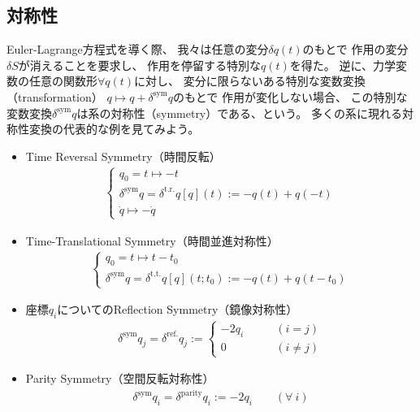 \subsection{対称性}

Euler-Lagrange方程式を導く際、
我々は任意の変分$\delta q(t)$のもとで
作用の変分$\delta S$が消えることを要求し、
作用を停留する特別な$q(t)$を得た。
逆に、力学変数の任意の関数形$\forall q(t)$に対し、
変分に限らないある特別な変数変換（transformation）
$q \mapsto q + \delta^{\mathrm{sym}} q$のもとで
作用が変化しない場合、
この特別な変数変換$\delta^{\mathrm{sym}} q$は系の対称性（symmetry）である、という。
多くの系に現れる対称性変換の代表的な例を見てみよう。
\begin{itemize}
  \item{Time Reversal Symmetry（時間反転）}
  \begin{align}
    \begin{cases}
      q_0 = t \mapsto -t
      \\
      \delta^{\mathrm{sym}} q
      =
      \delta^{\mathrm{t.r.}} q [q](t)
      := -q(t) + q(-t)
      \\
      \dot{q} \mapsto -\dot{q}
    \end{cases}
  \end{align}
  \item {Time-Translational Symmetry（時間並進対称性）}
  \begin{align}
    \begin{cases}
      q_0 = t \mapsto t - t_0
      \\
      \delta^{\mathrm{sym}} q
      =
      \delta^{\mathrm{t.t.}} q[q](t; t_0)
      := -q(t) + q(t-t_0)
    \end{cases}
  \label{time translation}
  \end{align}
  \item {座標$q_i$についてのReflection Symmetry（鏡像対称性）}
  \begin{align}
    \delta^{\mathrm{sym}} q_j
    =
    \delta^{\mathrm{ref.}} q_j
    :=
    \begin{cases}
    - 2 q_i
    \qquad &(i = j)
    \\
    0
    \qquad &(i\neq j)
    \end{cases}
  \end{align}
  \item {Parity Symmetry（空間反転対称性）}
  \begin{align}
      \delta^{\mathrm{sym}} q_i
      =
      \delta^{\mathrm{parity}} q_i
      := - 2 q_i
  \qquad
  (\forall\ i)
  \end{align}

\end{itemize}
